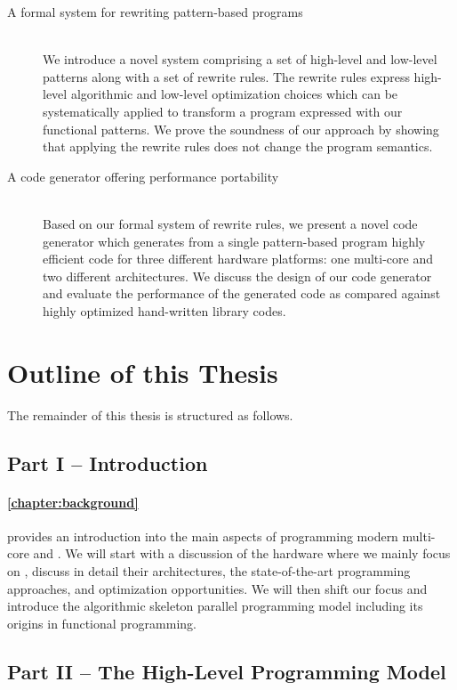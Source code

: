 \begin{description}
  \item[A formal system for rewriting pattern-based programs]\hfill\\[-1em]
    We introduce a novel system comprising a set of high-level and low-level patterns along with a set of rewrite rules.
    The rewrite rules express high-level algorithmic and low-level optimization choices which can be systematically applied to transform a program expressed with our functional patterns.
    We prove the soundness of our approach by showing that applying the rewrite rules does not change the program semantics.

  \item[A code generator offering performance portability]\hfill\\[.25em]
    Based on our formal system of rewrite rules, we present a novel code generator which generates from a single pattern-based program highly efficient \OpenCL code for three different hardware platforms:
    one multi-core \CPU and two different \GPU architectures.
    We discuss the design of our code generator and evaluate the performance of the generated \OpenCL code as compared against highly optimized hand-written library codes.
\end{description}

\section{Outline of this Thesis}
The remainder of this thesis is structured as follows.

\subsection*{Part I -- Introduction}

\paragraph{\autoref{chapter:background}} provides an introduction into the main aspects of programming modern multi-core \CPUs and \GPUs.
We will start with a discussion of the hardware where we mainly focus on \GPUs, discuss in detail their architectures, the state-of-the-art programming approaches, and optimization opportunities.
We will then shift our focus and introduce the algorithmic skeleton parallel programming model including its origins in functional programming.


\subsection*{Part II -- The \SkelCL High-Level Programming Model}

